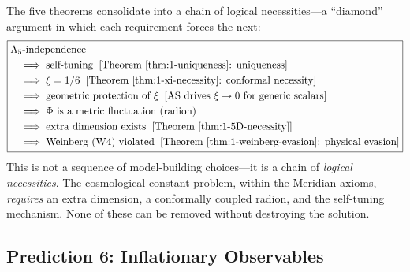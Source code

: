 The five theorems consolidate into a chain of logical necessities---a ``diamond'' argument in which each requirement forces the next:
\begin{equation}
\label{eq:1-necessity-chain}
\boxed{
\begin{aligned}
&\Lambda_5\text{-independence} \\
&\quad\Longrightarrow\; \text{self-tuning}\;\; [\text{Theorem~\ref{thm:1-uniqueness}: uniqueness}] \\
&\quad\Longrightarrow\; \xi = 1/6\;\; [\text{Theorem~\ref{thm:1-xi-necessity}: conformal necessity}] \\
&\quad\Longrightarrow\; \text{geometric protection of } \xi\;\; [\text{AS drives } \xi \to 0 \text{ for generic scalars}] \\
&\quad\Longrightarrow\; \Phi \text{ is a metric fluctuation (radion)} \\
&\quad\Longrightarrow\; \text{extra dimension exists}\;\; [\text{Theorem~\ref{thm:1-5D-necessity}}] \\
&\quad\Longrightarrow\; \text{Weinberg (W4) violated}\;\; [\text{Theorem~\ref{thm:1-weinberg-evasion}: physical evasion}]
\end{aligned}
}
\end{equation}
This is not a sequence of model-building choices---it is a chain of \emph{logical necessities}. The cosmological constant problem, within the Meridian axioms, \emph{requires} an extra dimension, a conformally coupled radion, and the self-tuning mechanism. None of these can be removed without destroying the solution.


%


\subsection{Prediction 6: Inflationary Observables}
\label{sec:1-pred6}

